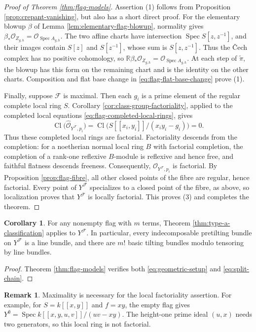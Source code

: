 \documentclass[a4paper,reqno]{amsart}
\def\F{\mathcal{F}}
\def\O{\mathcal{O}}
\DeclareMathOperator{\Cl}{Cl}
\DeclareMathOperator{\Spec}{Spec}
\theoremstyle{definition}
\newtheorem{Cor}[Thm]{Corollary}
\newtheorem{Rem}[Thm]{Remark}
\begin{document}
\begin{proof}[Proof of Theorem \ref{thm:flag-models}]
Assertion (1) follows from Proposition \ref{prop:crepant-vanishing}, but also has a short direct proof. For the elementary blowup $\beta$ of Lemma \ref{lem:elementary-flag-blowup}, normality gives $\beta_*\O_{Z_{g,h}}=\O_{\Spec A_{g,h}}$. The two affine charts have intersection $\Spec S[z,z^{-1}]$, and their images contain $S[z]$ and $S[z^{-1}]$, whose sum is $S[z,z^{-1}]$. Thus the \v{C}ech complex has no positive cohomology, so $\mathbb R\beta_*\O_{Z_{g,h}}=\O_{\Spec A_{g,h}}$. At each step of $\widetilde\pi$, the blowup has this form on the remaining chart and is the identity on the other charts. Composition and flat base change in \eqref{eq:flag-flat-base-change} prove (1).

Finally, suppose $\F$ is maximal. Then each $g_i$ is a prime element of the regular complete local ring $S$. Corollary \ref{cor:class-group-factoriality}, applied to the completed local equations \eqref{eq:flag-completed-local-rings}, gives
\[
\Cl\bigl(\widehat{\O}_{Y^\F,p_i}\bigr)
=\Cl\bigl(S[[x_i,y_i]]/(x_iy_i-g_i)\bigr)=0.
\]
Thus these completed local rings are factorial. Factoriality descends from the completion: for a noetherian normal local ring $B$ with factorial completion, the completion of a rank-one reflexive $B$-module is reflexive and hence free, and faithful flatness descends freeness. Consequently, $\O_{Y^\F,p_i}$ is factorial. By Proposition \ref{prop:flag-fibre}, all other closed points of the fibre are regular, hence factorial. Every point of $Y^\F$ specializes to a closed point of the fibre, as above, so localization proves that $Y^\F$ is locally factorial. This proves (3) and completes the theorem.
\end{proof}

\begin{Cor}\label{cor:flag-type-a}
For any nonempty flag with $m$ terms, Theorem \ref{thm:type-a-classification} applies to $Y^\F$. In particular, every indecomposable pretilting bundle on $Y^\F$ is a line bundle, and there are $m!$ basic tilting bundles modulo tensoring by line bundles.
\end{Cor}
\begin{proof}
Theorem \ref{thm:flag-models} verifies both \eqref{eq:geometric-setup} and \eqref{eq:split-chain}.
\end{proof}

\begin{Rem}
Maximality is necessary for the local factoriality assertion. For example, for $S=k[[x,y]]$ and $f=xy$, the empty flag gives $Y^\emptyset=\Spec k[[x,y,u,v]]/(uv-xy)$. The height-one prime ideal $(u,x)$ needs two generators, so this local ring is not factorial.
\end{Rem}
\end{document}
